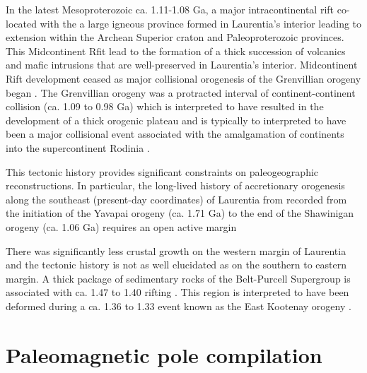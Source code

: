 \documentclass[11pt,letterpaper]{article}
\begin{document}
 In the latest Mesoproterozoic ca. 1.11-1.08 Ga, a major intracontinental rift co-located with the a large igneous province formed in Laurentia's interior leading to extension within the Archean Superior craton and Paleoproterozoic provinces. This Midcontinent Rfit lead to the formation of a thick succession of volcanics and mafic intrusions that are well-preserved in Laurentia's interior.  Midcontinent Rift development ceased as major collisional orogenesis of the Grenvillian orogeny began \citep{Swanson-Hysell2019a}. The Grenvillian orogeny was a protracted interval of continent-continent collision (ca. 1.09 to 0.98 Ga) which is interpreted to have resulted in the development of a thick orogenic plateau \citep{Rivers2008a} and is typically to interpreted to have been a major collisional event associated with the amalgamation of continents into the supercontinent Rodinia \citep{Hoffman1991a}.

This tectonic history provides significant constraints on paleogeographic reconstructions. In particular, the long-lived history of accretionary orogenesis along the southeast (present-day coordinates) of Laurentia from recorded from the initiation of the Yavapai orogeny (ca. 1.71 Ga) to the end of the Shawinigan orogeny (ca. 1.06 Ga) requires an open active margin

There was significantly less crustal growth on the western margin of Laurentia and the tectonic history is not as well elucidated as on the southern to eastern margin. A thick package of sedimentary rocks of the Belt-Purcell Supergroup is associated with ca. 1.47 to 1.40 rifting \citep{}. This region is interpreted to have been deformed during a ca. 1.36 to 1.33 event known as the East Kootenay orogeny \citep{McMechan1982a, Nesheim2012a, McFarlane2015a}. 





\section{Paleomagnetic pole compilation}
\end{document}
